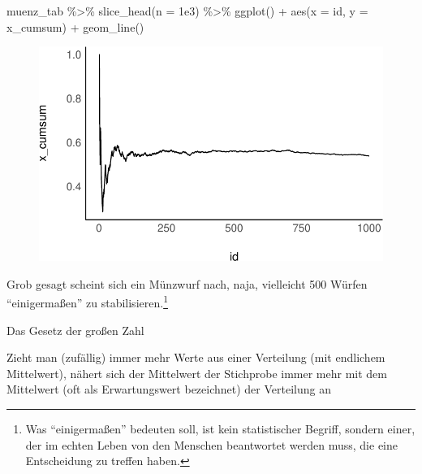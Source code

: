 \documentclass[
  a4paper,
  DIV=11]{scrreprt}
\newenvironment{Shaded}{\begin{snugshade}}{\end{snugshade}}
\newcommand{\AttributeTok}[1]{\textcolor[rgb]{0.40,0.45,0.13}{#1}}
\newcommand{\FloatTok}[1]{\textcolor[rgb]{0.68,0.00,0.00}{#1}}
\newcommand{\FunctionTok}[1]{\textcolor[rgb]{0.28,0.35,0.67}{#1}}
\newcommand{\NormalTok}[1]{\textcolor[rgb]{0.00,0.23,0.31}{#1}}
\newcommand{\SpecialCharTok}[1]{\textcolor[rgb]{0.37,0.37,0.37}{#1}}
\theoremstyle{definition}
\theoremstyle{remark}
\begin{document}
\begin{Shaded}
\begin{Highlighting}[]
\NormalTok{muenz\_tab }\SpecialCharTok{\%\textgreater{}\%} 
  \FunctionTok{slice\_head}\NormalTok{(}\AttributeTok{n =} \FloatTok{1e3}\NormalTok{) }\SpecialCharTok{\%\textgreater{}\%} 
  \FunctionTok{ggplot}\NormalTok{() }\SpecialCharTok{+}
  \FunctionTok{aes}\NormalTok{(}\AttributeTok{x =}\NormalTok{ id, }\AttributeTok{y =}\NormalTok{ x\_cumsum) }\SpecialCharTok{+}
  \FunctionTok{geom\_line}\NormalTok{()}
\end{Highlighting}
\end{Shaded}

\begin{figure}[H]

{\centering \includegraphics{./Verteilungen_files/figure-pdf/unnamed-chunk-24-1.pdf}

}

\end{figure}

Grob gesagt scheint sich ein Münzwurf nach, naja, vielleicht 500 Würfen
``einigermaßen'' zu stabilisieren.\footnote{Was ``einigermaßen''
  bedeuten soll, ist kein statistischer Begriff, sondern einer, der im
  echten Leben von den Menschen beantwortet werden muss, die eine
  Entscheidung zu treffen haben.}

\begin{tcolorbox}[enhanced jigsaw, colframe=quarto-callout-important-color-frame, title=\textcolor{quarto-callout-important-color}{\faExclamation}\hspace{0.5em}{Wichtig}, breakable, leftrule=.75mm, coltitle=black, toptitle=1mm, bottomrule=.15mm, bottomtitle=1mm, opacityback=0, arc=.35mm, rightrule=.15mm, left=2mm, colbacktitle=quarto-callout-important-color!10!white, opacitybacktitle=0.6, toprule=.15mm, titlerule=0mm, colback=white]
Das Gesetz der großen Zahl

Zieht man (zufällig) immer mehr Werte aus einer Verteilung (mit
endlichem Mittelwert), nähert sich der Mittelwert der Stichprobe immer
mehr mit dem Mittelwert (oft als Erwartungswert bezeichnet) der
Verteilung an
\end{tcolorbox}
\end{document}
